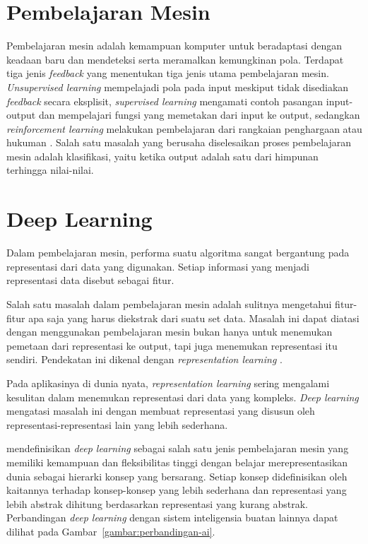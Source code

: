 \section{Pembelajaran Mesin}
Pembelajaran mesin adalah kemampuan komputer untuk beradaptasi dengan keadaan baru dan mendeteksi serta meramalkan kemungkinan pola. Terdapat tiga jenis \textit{feedback} yang menentukan tiga jenis utama pembelajaran mesin. \textit{Unsupervised learning} mempelajadi pola pada input meskiput tidak disediakan \textit{feedback} secara eksplisit, \textit{supervised learning} mengamati contoh pasangan input-output dan mempelajari fungsi yang memetakan dari input ke output, sedangkan \textit{reinforcement learning} melakukan pembelajaran dari rangkaian penghargaan atau hukuman \citep{Russell:2009:AIM:1671238}. Salah satu masalah yang berusaha diselesaikan proses pembelajaran mesin adalah klasifikasi, yaitu ketika output adalah satu dari himpunan terhingga nilai-nilai.


\section{Deep Learning}
Dalam pembelajaran mesin, performa suatu algoritma sangat bergantung pada representasi dari data yang digunakan. Setiap informasi yang menjadi representasi data disebut sebagai fitur.

Salah satu masalah dalam pembelajaran mesin adalah sulitnya mengetahui fitur-fitur apa saja yang harus diekstrak dari suatu set data. Masalah ini dapat diatasi dengan menggunakan pembelajaran mesin bukan hanya untuk menemukan pemetaan dari representasi ke output, tapi juga menemukan representasi itu sendiri. Pendekatan ini dikenal dengan \textit{representation learning} \citep{goodfellow-2016}.

Pada aplikasinya di dunia nyata, \textit{representation learning} sering mengalami kesulitan dalam menemukan representasi dari data yang kompleks. \textit{Deep learning} mengatasi masalah ini dengan membuat representasi yang disusun oleh representasi-representasi lain yang lebih sederhana.

\citeauthor{goodfellow-2016} mendefinisikan \textit{deep learning} sebagai salah satu jenis pembelajaran mesin yang memiliki kemampuan dan fleksibilitas tinggi dengan belajar merepresentasikan dunia sebagai hierarki konsep yang bersarang. Setiap konsep didefinisikan oleh kaitannya terhadap konsep-konsep yang lebih sederhana dan representasi yang lebih abstrak dihitung berdasarkan representasi yang kurang abstrak. Perbandingan \textit{deep learning} dengan sistem inteligensia buatan lainnya dapat dilihat pada Gambar~\ref{gambar:perbandingan-ai}.

